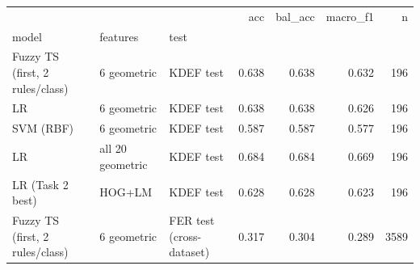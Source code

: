 \begin{tabular}{lllrrrr}
\toprule
                                &             &                          &   acc &  bal\_acc &  macro\_f1 &     n \\
model & features & test &       &          &           &       \\
\midrule
Fuzzy TS (first, 2 rules/class) & 6 geometric & KDEF test & 0.638 &    0.638 &     0.632 &   196 \\
LR & 6 geometric & KDEF test & 0.638 &    0.638 &     0.626 &   196 \\
SVM (RBF) & 6 geometric & KDEF test & 0.587 &    0.587 &     0.577 &   196 \\
LR & all 20 geometric & KDEF test & 0.684 &    0.684 &     0.669 &   196 \\
LR (Task 2 best) & HOG+LM & KDEF test & 0.628 &    0.628 &     0.623 &   196 \\
Fuzzy TS (first, 2 rules/class) & 6 geometric & FER test (cross-dataset) & 0.317 &    0.304 &     0.289 &  3589 \\
\bottomrule
\end{tabular}
